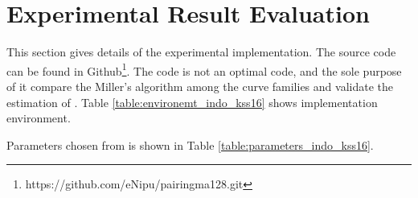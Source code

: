 \section{Experimental Result Evaluation}
This section gives details of the experimental implementation. The source code can be found in Github\footnote{\label{source_code_indo}https://github.com/eNipu/pairingma128.git}. 
The code  is not an optimal code, and the sole purpose of it compare the Miller's algorithm among the curve families and validate the estimation of \cite{EPRINT:BarDuq17}.
Table \ref{table:environemt_indo_kss16} shows implementation environment.  
\renewcommand{\baselinestretch}{1.5}
\begin{table}[ht]
\centering
\caption{Computational Environment}
\label{table:environemt_indo_kss16}
\end{table}
\renewcommand{\baselinestretch}{1.0}
Parameters chosen from \cite{EPRINT:BarDuq17} is shown in Table \ref{table:parameters_indo_kss16}.
\renewcommand{\baselinestretch}{1.5}
\begin{table}[ht]
\caption{Selected parameters for 128-bit security level \cite{EPRINT:BarDuq17}}
\label{table:parameters_indo_kss16}
\begin{center}		 
\end{center}
\end{table}
